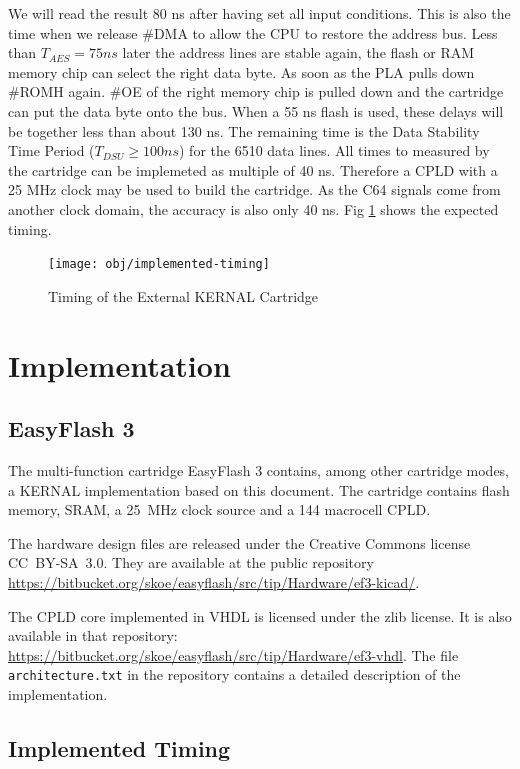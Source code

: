\documentclass[a4paper,oneside]{memoir}
\begin{document}
We will read the result 80 ns after having set all
input conditions. This is also the time when we release \#DMA to
allow the CPU to restore the address bus. Less than $T_{AES} = 75 ns$
later the address lines are stable again, the flash or RAM memory
chip can select the right data byte. As soon as the PLA pulls down
\#ROMH again. \#OE of the right memory chip is pulled down and the
cartridge can put the data byte onto the bus. When a 55 ns flash is
used, these delays will be together less than about 130 ns. The
remaining time is the Data Stability Time Period ($T_{DSU} \ge 100 ns$)
for the 6510 data lines. All times to measured by the cartridge can
be implemeted as multiple of 40 ns. Therefore a CPLD with a 25 MHz
clock may be used to build the cartridge. As the C64 signals come
from another clock domain, the accuracy is also only 40 ns. Fig
\ref {fig:timing} shows the expected timing.

\begin{figure}
    \centering
    \texttt{[image: obj/implemented-timing]}
    \caption{Timing of the External KERNAL Cartridge}
    \label{fig:timing}
\end{figure}

\chapter{Implementation}

\section{EasyFlash 3}

The multi-function cartridge EasyFlash 3 contains, among other 
cartridge modes, a KERNAL implementation based on this document. The
cartridge contains flash memory, SRAM, a 25~MHz clock source and a
144 macrocell CPLD.

The hardware design files are released under the Creative Commons
license CC~BY-SA~3.0. They are available at the public repository
\url{https://bitbucket.org/skoe/easyflash/src/tip/Hardware/ef3-kicad/}.

The CPLD core implemented in VHDL is licensed under the zlib
license. It is also available in that repository:
\url{https://bitbucket.org/skoe/easyflash/src/tip/Hardware/ef3-vhdl}.
The file \texttt{architecture.txt} in the repository contains a
detailed description of the implementation.

\section{Implemented Timing}
\end{document}
